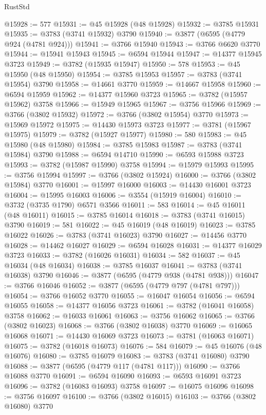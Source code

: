\begin{lexlean}{RustStd}
\begin{coremodule}
@15928 := 577
@15931 := @45 @15928 (@48 @15928)
@15932 := @3785 @15931
@15935 := @3783 (@3741 @15932) @3790
@15940 := @3877 (@6595 (@4779 @924 (@4781 @924)))
@15941 := @3766 @15940
@15943 := @3766 @6620 @3770
@15944 := @15941 @15943
@15945 := @6594 @15944
@15947 := @14377 @15945 @3723
@15949 := @3782 (@15935 @15947)
@15950 := 578
@15953 := @45 @15950 (@48 @15950)
@15954 := @3785 @15953
@15957 := @3783 (@3741 @15954) @3790
@15958 := @14661 @3770
@15959 := @14667 @15958
@15960 := @6594 @15959
@15962 := @14377 @15960 @3723
@15965 := @3782 (@15957 @15962) @3758
@15966 := @15949 @15965
@15967 := @3756 @15966
@15969 := @3766 (@3802 @15932)
@15972 := @3766 (@3802 @15954) @3770
@15973 := @15969 @15972
@15975 := @14430 @15973 @3723
@15977 := @3781 (@15967 @15975)
@15979 := @3782 (@15927 @15977)
@15980 := 580
@15983 := @45 @15980 (@48 @15980)
@15984 := @3785 @15983
@15987 := @3783 (@3741 @15984) @3790
@15988 := @6594 @14710
@15990 := @6593 @15988 @3723
@15993 := @3782 (@15987 @15990) @3758
@15994 := @15979 @15993
@15995 := @3756 @15994
@15997 := @3766 (@3802 @15924)
@16000 := @3766 (@3802 @15984) @3770
@16001 := @15997 @16000
@16003 := @14430 @16001 @3723
@16004 := @15995 @16003
@16006 := @3554 (@15919 @16004)
@16010 := @3732 (@3735 @1790) @6571 @3566
@16011 := 583
@16014 := @45 @16011 (@48 @16011)
@16015 := @3785 @16014
@16018 := @3783 (@3741 @16015) @3790
@16019 := 581
@16022 := @45 @16019 (@48 @16019)
@16023 := @3785 @16022
@16026 := @3783 (@3741 @16023) @3790
@16027 := @14456 @3770
@16028 := @14462 @16027
@16029 := @6594 @16028
@16031 := @14377 @16029 @3723
@16033 := @3782 (@16026 @16031)
@16034 := 582
@16037 := @45 @16034 (@48 @16034)
@16038 := @3785 @16037
@16041 := @3783 (@3741 @16038) @3790
@16046 := @3877 (@6595 (@4779 @938 (@4781 @938)))
@16047 := @3766 @16046
@16052 := @3877 (@6595 (@4779 @797 (@4781 @797)))
@16054 := @3766 @16052 @3770
@16055 := @16047 @16054
@16056 := @6594 @16055
@16058 := @14377 @16056 @3723
@16061 := @3782 (@16041 @16058) @3758
@16062 := @16033 @16061
@16063 := @3756 @16062
@16065 := @3766 (@3802 @16023)
@16068 := @3766 (@3802 @16038) @3770
@16069 := @16065 @16068
@16071 := @14430 @16069 @3723
@16073 := @3781 (@16063 @16071)
@16075 := @3782 (@16018 @16073)
@16076 := 584
@16079 := @45 @16076 (@48 @16076)
@16080 := @3785 @16079
@16083 := @3783 (@3741 @16080) @3790
@16088 := @3877 (@6595 (@4779 @117 (@4781 @117)))
@16090 := @3766 @16088 @3770
@16091 := @6594 @16090
@16093 := @6593 @16091 @3723
@16096 := @3782 (@16083 @16093) @3758
@16097 := @16075 @16096
@16098 := @3756 @16097
@16100 := @3766 (@3802 @16015)
@16103 := @3766 (@3802 @16080) @3770

\end{coremodule}
\end{lexlean}
